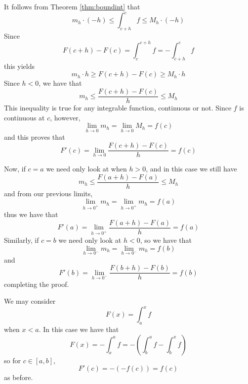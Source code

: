 \documentclass[12pt]{report}
\begin{document}
\begin{proof*}{}{}
    It follows from Theorem \ref{thm:boundint} that \begin{equation*}
        m_h\cdot (-h)\leq \int_{c+h}^{c}f \leq M_h\cdot (-h)
    \end{equation*}
    Since \begin{equation*}
        F(c+h) - F(c) = \int_c^{c+h}f = -\int_{c+h}^cf
    \end{equation*}
    this yields \begin{equation*}
        m_h\cdot h\geq F(c+h) - F(c) \geq M_h\cdot h
    \end{equation*}
    Since $h < 0$, we have that \begin{equation*}
        m_h \leq \frac{F(c+h) - F(c)}{h} \leq M_h
    \end{equation*}
    This inequality is true for any integrable function, continuous or not. Since $f$ is continuous at $c$, however, \begin{equation*}
        \lim\limits_{h\rightarrow 0}m_h = \lim\limits_{h\rightarrow 0}M_h = f(c)
    \end{equation*}
    and this proves that \begin{equation*}
        F'(c) = \lim\limits_{h\rightarrow 0}\frac{F(c+h) - F(c)}{h} = f(c)
    \end{equation*}


    Now, if $c = a$ we need only look at when $h > 0$, and in this case we still have  \begin{equation*}
        m_h \leq \frac{F(a+h) - F(a)}{h} \leq M_h
    \end{equation*}
    and from our previous limits, \begin{equation*}
        \lim\limits_{h\rightarrow 0^+}m_h = \lim\limits_{h\rightarrow 0^+}m_h = f(a)
    \end{equation*}
    thus we have that $$F'(a) = \lim\limits_{h\rightarrow 0^+}\frac{F(a+h)-F(a)}{h} = f(a)$$
    Similarly, if $c = b$ we need only look at $h < 0$, so we have that \begin{equation*}
        \lim\limits_{h\rightarrow 0^-}m_h = \lim\limits_{h\rightarrow 0^-}m_h = f(b)
    \end{equation*}
    and $$F'(b) = \lim\limits_{h\rightarrow 0^-}\frac{F(b+h)-F(b)}{h} = f(b)$$
    completing the proof.
\end{proof*}


\begin{rmk}{}{}
    We may consider \begin{equation}
        F(x) = \int_a^xf
    \end{equation}
    when $x < a$. In this case we have that \begin{equation}
        F(x) = -\int_x^af = -\left(\int_b^af - \int_b^xf\right)
    \end{equation}
    so for $c \in [a,b]$, \begin{equation}
        F'(c) = -(-f(c)) = f(c)
    \end{equation}
    as before.
\end{rmk}
\end{document}
